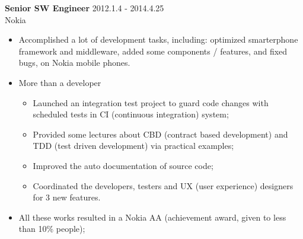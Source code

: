 \textbf{Senior SW Engineer} \hfill 2012.1.4 - 2014.4.25\\
        Nokia
        \begin{itemize}  \itemsep -2pt %
        \item Accomplished a lot of development tasks, including:
            optimized smarterphone framework and middleware, added some components / features, and fixed bugs,
        on Nokia mobile phones.
        \item More than a developer 
            \begin{itemize}  \itemsep -2pt
                \item Launched an integration test project to guard code changes
                with scheduled tests in CI (continuous integration) system;
                \item Provided some lectures about CBD (contract based development) and
                TDD (test driven development) via practical examples;
                \item Improved the auto documentation of source code;
                \item Coordinated the developers, testers and UX (user experience) designers for 3 new features.
            \end{itemize}
        \item All these works resulted in a Nokia AA (achievement award, given to less than 10\% people);
        \end{itemize}

